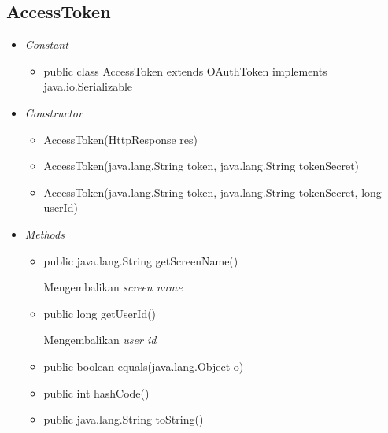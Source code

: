 \subsection{AccessToken}
	\begin{itemize}
		\item \textit{Constant}
		
		\begin{itemize}
			\item public class AccessToken
			extends OAuthToken
			implements java.io.Serializable
						
		\end{itemize}
		\item \textit{Constructor}
		
		\begin{itemize}
			\item AccessToken(HttpResponse res) 
			\item AccessToken(java.lang.String token, java.lang.String tokenSecret) 
			\item AccessToken(java.lang.String token, java.lang.String tokenSecret, long userId) 
		\end{itemize}
		\item \textit{Methods}
		
		\begin{itemize}
			\item public java.lang.String getScreenName()
			
			Mengembalikan \textit{screen name}
			\item public long getUserId()
			
			Mengembalikan \textit{user id}
			\item public boolean equals(java.lang.Object o)
			\item public int hashCode()
			\item public java.lang.String toString()
		\end{itemize}
	\end{itemize}
	
